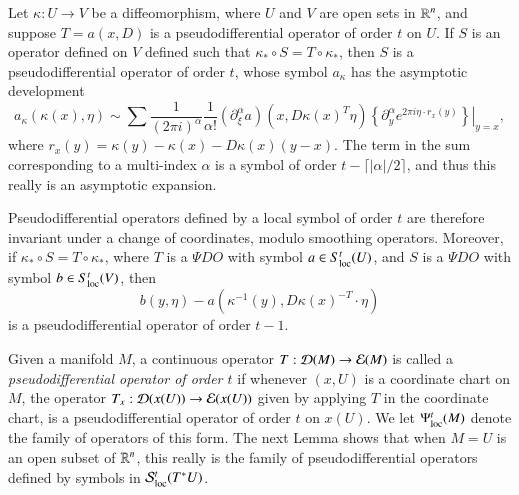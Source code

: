 \begin{theorem}
    Let $\kappa: U \to V$ be a diffeomorphism, where $U$ and $V$ are open sets in $\operatorname{\mathbb{R}}^n$, and suppose $T = a(x,D)$ is a pseudodifferential operator of order $t$ on $U$. If $S$ is an operator defined on $V$ defined such that $\kappa_* \circ S = T \circ \kappa_*$, then $S$ is a pseudodifferential operator of order $t$, whose symbol $a_\kappa$ has the asymptotic development
    \[ a_\kappa(\kappa(x),\eta) \sim \sum \frac{1}{(2 \pi i)^\alpha} \frac{1}{\alpha!} (\partial^\alpha_\xi a) (x,D\kappa(x)^T \eta) \left. \left\{ \partial^\alpha_y e^{2\pi i \eta \cdot r_x(y)} \right\} \right|_{y = x}, \]
    where $r_x(y) = \kappa(y) - \kappa(x) - D\kappa(x)(y-x)$. The term in the sum corresponding to a multi-index $\alpha$ is a symbol of order $t - \lceil |\alpha| / 2 \rceil$, and thus this really is an asymptotic expansion.
\end{theorem}

Pseudodifferential operators defined by a local symbol of order $t$ are therefore invariant under a change of coordinates, modulo smoothing operators. Moreover, if $\kappa_* \circ S = T \circ \kappa_*$, where $T$ is a $\Psi DO$ with symbol $a \in S_{\text{loc}}^t(U)$, and $S$ is a $\Psi DO$ with symbol $b \in S_{\text{loc}}^t(V)$, then
%
\[ b(y,\eta) - a(\kappa^{-1}(y), D\kappa(x)^{-T} \cdot \eta) \]
%
is a pseudodifferential operator of order $t - 1$.


Given a manifold $M$, a continuous operator $T: \operatorname{\mathcal{D}}(M) \to \operatorname{\mathcal{E}}(M)$ is called a \emph{pseudodifferential operator of order $t$} if whenever $(x,U)$ is a coordinate chart on $M$, the operator $T_x: \operatorname{\mathcal{D}}(x(U)) \to \operatorname{\mathcal{E}}(x(U))$ given by applying $T$ in the coordinate chart, is a pseudodifferential operator of order $t$ on $x(U)$. We let $\Psi^t_{\text{loc}}(M)$ denote the family of operators of this form. The next Lemma shows that when $M = U$ is an open subset of $\operatorname{\mathbb{R}}^n$, this really is the family of pseudodifferential operators defined by symbols in $\mathcal{S}^t_{\text{loc}}(T^* U)$.

